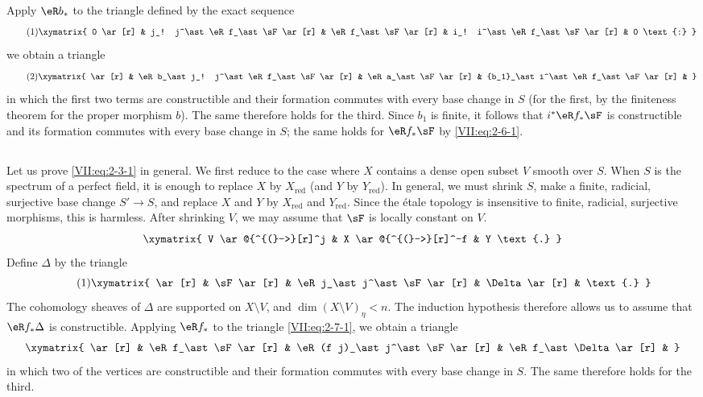 Apply $\eR b_\ast$ to the triangle defined by the exact sequence
\begin{equation*}\tag{1}\label{VII:eq:2-6-1}
\xymatrix{
  0 \ar[r] 
    & j_! j^\ast \eR f_\ast \sF \ar[r] 
    & \eR f_\ast \sF \ar[r] 
    & i_! i^\ast \eR f_\ast \sF \ar[r] 
    & 0 \text{:} 
}
\end{equation*}
we obtain a triangle
\begin{equation*}\tag{2}\label{VII:eq:2-6-2}
\xymatrix{
  \ar[r] 
    & \eR b_\ast j_! j^\ast \eR f_\ast \sF \ar[r] 
    & \eR a_\ast \sF \ar[r] 
    & {b_1}_\ast i^\ast \eR f_\ast \sF \ar[r] 
    & 
}
\end{equation*}
in which the first two terms are constructible and their formation commutes
with every base change in $S$ (for the first, by the finiteness theorem for
the proper morphism $b$). The same therefore holds for the third. Since $b_1$
is finite, it follows that $i^\ast \eR f_\ast \sF$ is constructible and its
formation commutes with every base change in $S$; the same holds for
$\eR f_\ast \sF$ by \eqref{VII:eq:2-6-1}.





\subsection{}\label{VII:2-7}

Let us prove \eqref{VII:eq:2-3-1} in general. We first reduce to the case where
$X$ contains a dense open subset $V$ smooth over $S$. When $S$ is the spectrum
of a perfect field, it is enough to replace $X$ by $X_\text{red}$ (and $Y$ by
$Y_\text{red}$). In general, we must shrink $S$, make a finite, radicial,
surjective base change $S' \to S$, and replace $X$ and $Y$ by $X_\text{red}$
and $Y_\text{red}$. Since the étale topology is insensitive to finite,
radicial, surjective morphisms, this is harmless. After shrinking $V$, we may
assume that $\sF$ is locally constant on $V$.
\[\xymatrix{
  V \ar@{^{(}->}[r]^j 
    & X \ar@{^{(}->}[r]^-f 
    & Y \text{.} 
}\]
Define $\Delta$ by the triangle
\begin{equation*}\tag{1}\label{VII:eq:2-7-1}
\xymatrix{
  \ar[r] 
    & \sF \ar[r] 
    & \eR j_\ast j^\ast \sF \ar[r] 
    & \Delta \ar[r] 
    & \text{.} 
}
\end{equation*}
The cohomology sheaves of $\Delta$ are supported on $X\setminus V$, and
$\dim(X\setminus V)_\eta < n$. The induction hypothesis therefore allows us
to assume that $\eR f_\ast \Delta$ is constructible. Applying $\eR f_\ast$ to
the triangle \eqref{VII:eq:2-7-1}, we obtain a triangle
\[\xymatrix{
  \ar[r] 
    & \eR f_\ast \sF \ar[r] 
    & \eR(f j)_\ast j^\ast \sF \ar[r] 
    & \eR f_\ast \Delta \ar[r] 
    & 
}\]
in which two of the vertices are constructible and their formation commutes
with every base change in $S$. The same therefore holds for the third.





